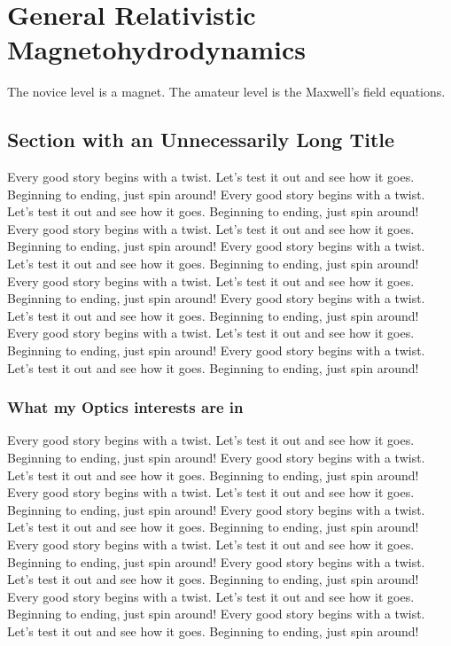 \chapter{General Relativistic Magnetohydrodynamics}

The novice level is a magnet. The amateur level is the Maxwell's field equations. 
\section[What my Optics Studies have been]{Section with an Unnecessarily Long Title}

Every good story begins with a twist. Let's test it out and see how it goes. Beginning to ending, just spin around! Every good story begins with a twist. Let's test it out and see how it goes. Beginning to ending, just spin around! Every good story begins with a twist. Let's test it out and see how it goes. Beginning to ending, just spin around! Every good story begins with a twist. Let's test it out and see how it goes. Beginning to ending, just spin around! Every good story begins with a twist. Let's test it out and see how it goes. Beginning to ending, just spin around! Every good story begins with a twist. Let's test it out and see how it goes. Beginning to ending, just spin around! Every good story begins with a twist. Let's test it out and see how it goes. Beginning to ending, just spin around! Every good story begins with a twist. Let's test it out and see how it goes. Beginning to ending, just spin around!

\subsection{What my Optics interests are in}

Every good story begins with a twist. Let's test it out and see how it goes. Beginning to ending, just spin around! Every good story begins with a twist. Let's test it out and see how it goes. Beginning to ending, just spin around! Every good story begins with a twist. Let's test it out and see how it goes. Beginning to ending, just spin around! Every good story begins with a twist. Let's test it out and see how it goes. Beginning to ending, just spin around! Every good story begins with a twist. Let's test it out and see how it goes. Beginning to ending, just spin around! Every good story begins with a twist. Let's test it out and see how it goes. Beginning to ending, just spin around! Every good story begins with a twist. Let's test it out and see how it goes. Beginning to ending, just spin around! Every good story begins with a twist. Let's test it out and see how it goes. Beginning to ending, just spin around!

